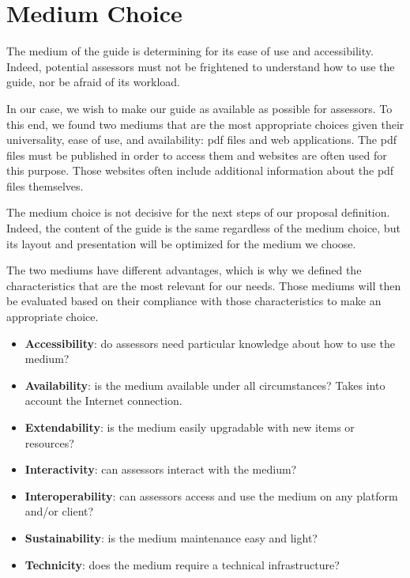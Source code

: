 \section{Medium Choice}
\label{sec:proposal_medium}

The medium of the guide is determining for its ease of use and accessibility. Indeed, potential assessors must not be frightened to understand how to use the guide, nor be afraid of its workload.

In our case, we wish to make our guide as available as possible for assessors. To this end, we found two mediums that are the most appropriate choices given their universality, ease of use, and availability: \gls{pdf} files and web applications. The \gls{pdf} files must be published in order to access them and websites are often used for this purpose. Those websites often include additional information about the \gls{pdf} files themselves.

The medium choice is not decisive for the next steps of our proposal definition. Indeed, the content of the guide is the same regardless of the medium choice, but its layout and presentation will be optimized for the medium we choose.

The two mediums have different advantages, which is why we defined the characteristics that are the most relevant for our needs. Those mediums will then be evaluated based on their compliance with those characteristics to make an appropriate choice.
\begin{itemize}
    \item \textbf{Accessibility}: do assessors need particular knowledge about how to use the medium?
    \item \textbf{Availability}: is the medium available under all circumstances? Takes into account the Internet connection.
    \item \textbf{Extendability}: is the medium easily upgradable with new items or resources?
    \item \textbf{Interactivity}: can assessors interact with the medium?
    \item \textbf{Interoperability}: can assessors access and use the medium on any platform and/or client?
    \item \textbf{Sustainability}: is the medium maintenance easy and light?
    \item \textbf{Technicity}: does the medium require a technical infrastructure?
\end{itemize}

